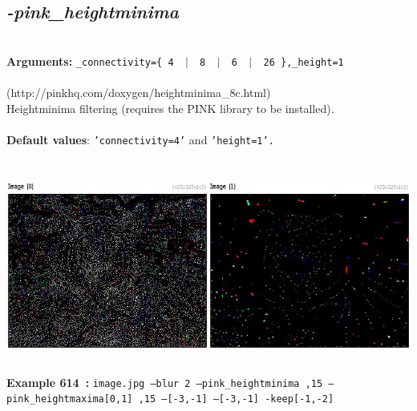 \documentclass[a4paper,11pt,twoside]{book}
\begin{document}
\subsection{\emph{-pink\_heightminima} }\vspace*{-0.5em}
~\\\textbf{Arguments: } 
{\small \texttt{\_connectivity=\{ 4 ~$|$~ 8 ~$|$~ 6 ~$|$~ 26 \},\_height=1}}\\~\\
(http://pinkhq.com/doxygen/heightminima\_8c.html)
~\\Heightminima filtering (requires the PINK library to be installed).
~\\~\\\textbf{Default values}: {\small \texttt{'connectivity=4'} and \texttt{'height=1'.}}
\begin{center}\includegraphics[keepaspectratio=true,height=7cm,width=\textwidth]{img/gmic_def614.jpg}\\
{\footnotesize \textbf{Example 614~:} \texttt{image.jpg --blur 2 --pink\_heightminima ,15 --pink\_heightmaxima[0,1] ,15 --[-3,-1] --[-3,-1] -keep[-1,-2]}}
\end{center}
\end{document}
